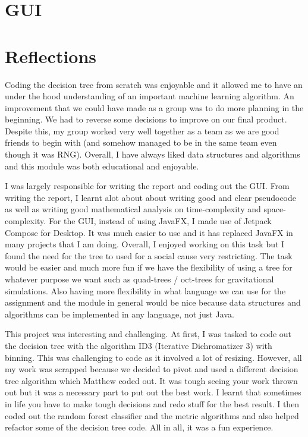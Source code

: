 \section{GUI}


\section{Reflections}
 Coding the decision tree from scratch was enjoyable and it allowed me to have an under the hood understanding of an important machine learning algorithm. An improvement that we could have made as a group was to do more planning in the beginning. We had to reverse some decisions to improve on our final product. Despite this, my group worked very well together as a team as we are good friends to begin with (and somehow managed to be in the same team even though it was RNG). Overall, I have always liked data structures and algorithms and this module was both educational and enjoyable.

 I was largely responsible for writing the report and coding out the GUI. From writing the report, I learnt alot about about writing good and clear pseudocode as well as writing good mathematical analysis on time-complexity and space-complexity. For the GUI, instead of using JavaFX, I made use of Jetpack Compose for Desktop. It was much easier to use and it has replaced JavaFX in many projects that I am doing. Overall, I enjoyed working on this task but I found the need for the tree to used for a social cause very restricting. The task would be easier and much more fun if we have the flexibility of using a tree for whatever purpose we want such as quad-trees / oct-trees for gravitational simulations. Also having more flexibility in what language we can use for the assignment and the module in general would be nice because data structures and algorithms can be implemented in any language, not just Java.

 This project was interesting and challenging. At first, I was tasked to code out the decision tree with the algorithm ID3 (Iterative Dichromatizer 3) with binning. This was challenging to code as it involved a lot of resizing. However, all my work was scrapped because we decided to pivot and used a different decision tree algorithm which Matthew coded out. It was tough seeing your work thrown out but it was a necessary part to put out the best work. I learnt that sometimes in life you have to make tough decisions and redo stuff for the best result. I then coded out the random forest classifier and the metric algorithms and also helped refactor some of the decision tree code. All in all, it was a fun experience.

